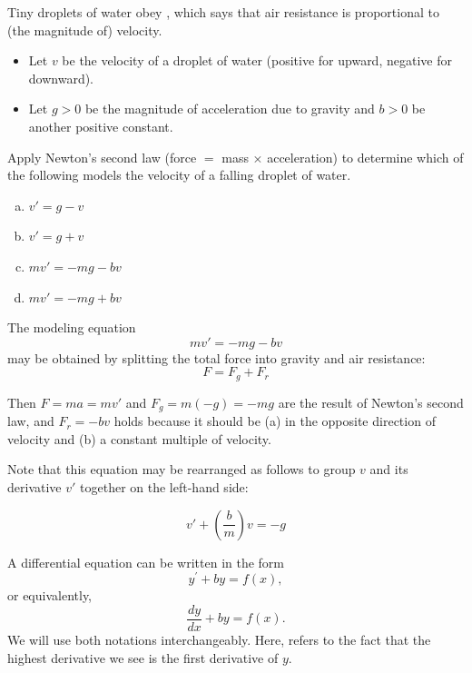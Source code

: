 \begin{applicationActivities}
\begin{activity}{5}
Tiny droplets of water obey , which says that air resistance is proportional to (the magnitude of) velocity.
\begin{itemize}
\item Let \(v\) be the velocity of a droplet of water (positive for upward, negative for downward).
\item Let \(g>0\) be the magnitude of acceleration due to gravity and \(b>0\) be another positive constant.
\end{itemize}
\vfill
Apply Newton's second law (force \(=\) mass \(\times\) acceleration) 
to determine which of the following
 models the velocity of a falling droplet of water. 
\vfill
\begin{enumerate}[(a)]
\item \(v'=g-v\)
\item \(v'=g+v\)
\item \(mv'=-mg-bv\)
\item \(mv'=-mg+bv\)
\end{enumerate}
\end{activity}

\begin{observation}
The modeling equation
\[mv'=-mg-bv\]
may be obtained by splitting the total force into gravity and air resistance:
\[F=F_g+F_r\]

Then \(F=ma=mv'\) and \(F_g=m(-g)=-mg\) are the result of Newton's second law,
and \(F_r=-bv\) holds because it should be (a) in the opposite direction of velocity 
and (b) a constant multiple of velocity.

\vfill

Note that this equation may be rearranged as follows to group \(v\)
and its derivative \(v'\) together on the left-hand side:

\[v'+\left(\frac{b}{m}\right)v=-g\]
\end{observation}

\begin{definition}
A  differential equation can be written in the form
\[y^\prime+by=f(x),\]
or equivalently,
\[\frac{dy}{dx} +by=f(x).\]
We will use both notations interchangeably.
\vfill
Here,  refers to the fact that the highest derivative we see is the first derivative of \(y\).
\end{definition}


\end{applicationActivities}
